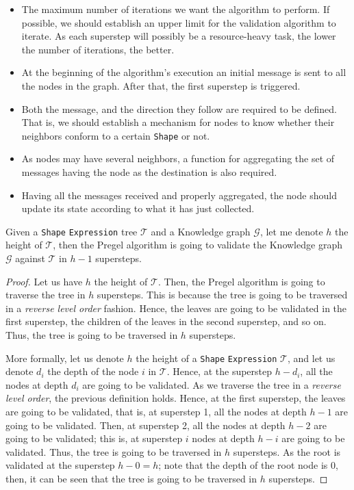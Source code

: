 \begin{itemize}
    \itemsep0.5em
    \item The maximum number of iterations we want the algorithm to perform. If possible, we should establish an upper limit for the validation algorithm to iterate. As each superstep will possibly be a resource-heavy task, the lower the number of iterations, the better.
    \item At the beginning of the algorithm's execution an initial message is sent to all the nodes in the graph. After that, the first superstep is triggered.
    \item Both the message, and the direction they follow are required to be defined. That is, we should establish a mechanism for nodes to know whether their neighbors conform to a certain \texttt{Shape} or not.
    \item As nodes may have several neighbors, a function for aggregating the set of messages having the node as the destination is also required.
    \item Having all the messages received and properly aggregated, the node should update its state according to what it has just collected.
\end{itemize}

\begin{theorem}
    Given a \texttt{Shape} \texttt{Expression} tree $\mathcal{T}$ and a Knowledge graph $\mathcal{G}$, let me denote $h$ the height of $\mathcal{T}$, then the Pregel algorithm is going to validate the Knowledge graph $\mathcal{G}$ against $\mathcal{T}$ in $h - 1$ supersteps.
\end{theorem}

\begin{proof}
    Let us have $h$ the height of $\mathcal{T}$. Then, the Pregel algorithm is going to traverse the tree in $h$ supersteps. This is because the tree is going to be traversed in a \textit{reverse level order} fashion. Hence, the leaves are going to be validated in the first superstep, the children of the leaves in the second superstep, and so on. Thus, the tree is going to be traversed in $h$ supersteps.

    More formally, let us denote $h$ the height of a \texttt{Shape} \texttt{Expression} $\mathcal{T}$, and let us denote $d_i$ the depth of the node $i$ in $\mathcal{T}$. Hence, at the superstep $h - d_i$, all the nodes at depth $d_i$ are going to be validated. As we traverse the tree in a \textit{reverse level order}, the previous definition holds. Hence, at the first superstep, the leaves are going to be validated, that is, at superstep 1, all the nodes at depth $h - 1$ are going to be validated. Then, at superstep 2, all the nodes at depth $h - 2$ are going to be validated; this is, at superstep $i$ nodes at depth $h - i$ are going to be validated. Thus, the tree is going to be traversed in $h$ supersteps. As the root is validated at the superstep $h - 0 = h$; note that the depth of the root node is 0, then, it can be seen that the tree is going to be traversed in $h$ supersteps.
\end{proof}

